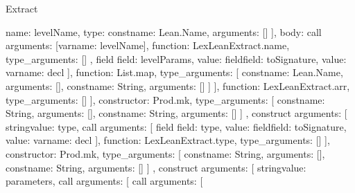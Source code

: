 \begin{lexlean}{Extract}
\begin{toolingmodule}
{{{{{{{{{{{                                      {name: levelName, type: const{name: Lean.Name, arguments: []}}
                                    ],
                                    body: call{
                                      arguments: [var{name: levelName}],
                                      function: LexLeanExtract.name,
                                      type_arguments: []
                                    }
                                  },
                                  field{
                                    field: levelParams,
                                    value: field{field: toSignature, value: var{name: decl}}
                                  }
                                ],
                                function: List.map,
                                type_arguments: [
                                  const{name: Lean.Name, arguments: []},
                                  const{name: String, arguments: []}
                                ]
                              }
                            ],
                            function: LexLeanExtract.arr,
                            type_arguments: []
                          }
                        ],
                        constructor: Prod.mk,
                        type_arguments: [
                          const{name: String, arguments: []},
                          const{name: String, arguments: []}
                        ]
                      },
                      construct{
                        arguments: [
                          string{value: type},
                          call{
                            arguments: [
                              field{
                                field: type,
                                value: field{field: toSignature, value: var{name: decl}}
                              }
                            ],
                            function: LexLeanExtract.type,
                            type_arguments: []
                          }
                        ],
                        constructor: Prod.mk,
                        type_arguments: [
                          const{name: String, arguments: []},
                          const{name: String, arguments: []}
                        ]
                      },
                      construct{
                        arguments: [
                          string{value: parameters},
                          call{
                            arguments: [
                              call{
                                arguments: [
}}}}}}}}}}
\end{toolingmodule}
\end{lexlean}
